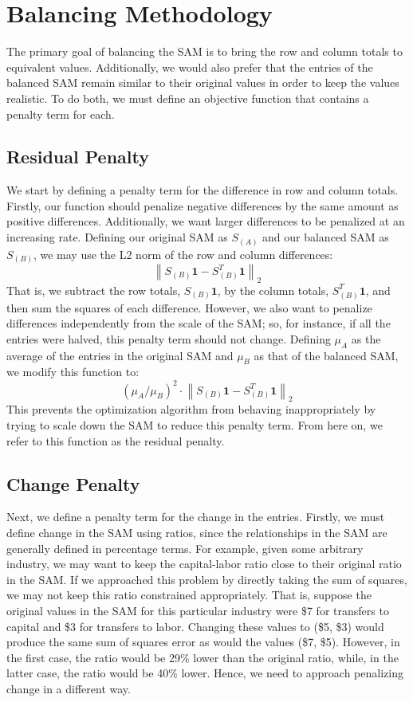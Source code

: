 \documentclass[12pt]{article}
\begin{document}
	
	\section{Balancing Methodology}
	
	The primary goal of balancing the SAM is to bring the row and column totals to equivalent values. Additionally, we would also prefer that the entries of the balanced SAM remain similar to their original values in order to keep the values realistic. To do both, we must define an objective function that contains a penalty term for each. 
	
	\subsection{Residual Penalty}
	
	We start by defining a penalty term for the difference in row and column totals. Firstly, our function should penalize negative differences by the same amount as positive differences. Additionally, we want larger differences to be penalized at an increasing rate. Defining our original SAM as $S_{(A)}$ and our balanced SAM as $S_{(B)}$, we may use the L2 norm of the row and column differences:
	$$\left\| S_{(B)} \textbf{1} - S_{(B)}^T \textbf{1} \right\|_2$$ 
	That is, we subtract the row totals,  $S_{(B)} \textbf{1}$, by the column totals, $S^T_{(B)} \textbf{1}$, and then sum the squares of each difference. However, we also want to penalize differences independently from the scale of the SAM; so, for instance, if all the entries were halved, this penalty term should not change. Defining $\mu_A$ as the average of the entries in the original SAM and $\mu_B$ as that of the balanced SAM, we modify this function to:
	$$(\mu_A / \mu_B)^2 \cdot \left\| S_{(B)} \textbf{1} - S_{(B)}^T \textbf{1} \right\|_2$$ 
	This prevents the optimization algorithm from behaving inappropriately by trying to scale down the SAM to reduce this penalty term. From here on, we refer to this function as the residual penalty. 
	
	\subsection{Change Penalty}
	
	Next, we define a penalty term for the change in the entries. Firstly, we must define change in the SAM using ratios, since the relationships in the SAM are generally defined in percentage terms. For example, given some arbitrary industry, we may want to keep the capital-labor ratio close to their original ratio in the SAM. If we approached this problem by directly taking the sum of squares, we may not keep this ratio constrained appropriately. That is, suppose the original values in the SAM for this particular industry were \$7 for transfers to capital and \$3 for transfers to labor. Changing these values to (\$5, \$3) would produce the same sum of squares error as would the values (\$7, \$5). However, in the first case, the ratio would be 29\% lower than the original ratio, while, in the latter case, the ratio would be 40\% lower. Hence, we need to approach penalizing change in a different way.
	
\end{document}
